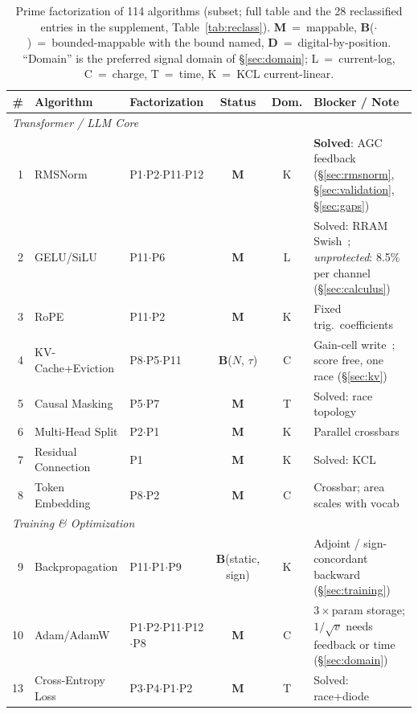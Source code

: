 \documentclass[11pt]{article}
\begin{document}
\begin{table}[t]
\centering
\caption{Prime factorization of 114 algorithms (subset; full table and the 28 reclassified entries in the supplement, Table~\ref{tab:reclass}). \textbf{M}~=~mappable, \textbf{B}($\cdot$)~=~bounded-mappable with the bound named, \textbf{D}~=~digital-by-position. ``Domain'' is the preferred signal domain of \S\ref{sec:domain}; L~=~current-log, C~=~charge, T~=~time, K~=~KCL current-linear.}
\label{tab:factorizations}
\footnotesize
\begin{tabular}{rllccp{4.5cm}}
\toprule
\# & Algorithm & Factorization & Status & Dom. & Blocker / Note \\
\midrule
\multicolumn{6}{l}{\textit{Transformer / LLM Core}} \\
1 & RMSNorm & P1$\cdot$P2$\cdot$P11$\cdot$P12 & \textbf{M} & K & \textbf{Solved}: AGC feedback (\S\ref{sec:rmsnorm}, \S\ref{sec:validation}, \S\ref{sec:gaps}) \\
2 & GELU/SiLU & P11$\cdot$P6 & \textbf{M} & L & Solved: RRAM Swish~\cite{rram_swish2022}; \textit{unprotected}: 8.5\% per channel (\S\ref{sec:calculus}) \\
3 & RoPE & P11$\cdot$P2 & \textbf{M} & K & Fixed trig.\ coefficients \\
4 & KV-Cache+Eviction & P8$\cdot$P5$\cdot$P11 & \textbf{B}($N$, $\tau$) & C & Gain-cell write~\cite{leroux2025a}; score free, one race (\S\ref{sec:kv}) \\
5 & Causal Masking & P5$\cdot$P7 & \textbf{M} & T & Solved: race topology~\cite{bieg2026sba} \\
6 & Multi-Head Split & P2$\cdot$P1 & \textbf{M} & K & Parallel crossbars \\
7 & Residual Connection & P1 & \textbf{M} & K & Solved: KCL~\cite{bieg2026sba} \\
8 & Token Embedding & P8$\cdot$P2 & \textbf{M} & C & Crossbar; area scales with vocab \\
\midrule
\multicolumn{6}{l}{\textit{Training \& Optimization}} \\
9 & Backpropagation & P11$\cdot$P1$\cdot$P9 & \textbf{B}(static, sign) & K & Adjoint / sign-concordant backward (\S\ref{sec:training}) \\
10 & Adam/AdamW & P1$\cdot$P2$\cdot$P11$\cdot$P12$\cdot$P8 & \textbf{M} & C & $3\times$param storage; $1/\sqrt{v}$ needs feedback or time (\S\ref{sec:domain}) \\
13 & Cross-Entropy Loss & P3$\cdot$P4$\cdot$P1$\cdot$P2 & \textbf{M} & T & Solved: race+diode~\cite{bieg2026sba} \\

\end{tabular}
\end{table}
\end{document}
